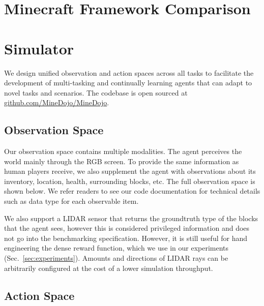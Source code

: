 \newcommand{\direct}[0]{\textsc{Direct}\xspace}
\newcommand{\rdelta}[0]{\textsc{Delta}\xspace}
\renewcommand{\thefigure}{A.\arabic{figure}}
\setcounter{figure}{0}
\renewcommand{\thetable}{A.\arabic{table}}
\setcounter{table}{0}


\section{Minecraft Framework Comparison}


\section{\minedojo Simulator}
\label{supp:sec:sim}

We design unified observation and action spaces across all tasks to facilitate the development of multi-tasking and continually learning agents that can adapt to novel tasks and scenarios. The codebase is open sourced at \href{https://github.com/MineDojo/MineDojo}{github.com/MineDojo/MineDojo}. 

\subsection{Observation Space}
\label{supp:sec:sim_obs_space}

Our observation space contains multiple modalities. The agent perceives the world mainly through the RGB screen. To provide the same information as human players receive, we also supplement the agent with observations about its inventory, location, health, surrounding blocks, etc. The full observation space is shown below. We refer readers to see our code documentation for technical details such as data type for each observable item.

We also support a LIDAR sensor that returns the groundtruth type of the blocks that the agent sees, however this is considered privileged information and does not go into the benchmarking specification. However, it is still useful for hand engineering the dense reward function, which we use in our experiments (Sec.~\ref{sec:experiments}). Amounts and directions of LIDAR rays can be arbitrarily configured at the cost of a lower simulation throughput.



\subsection{Action Space}
\label{supp:sec:sim_action_space}


